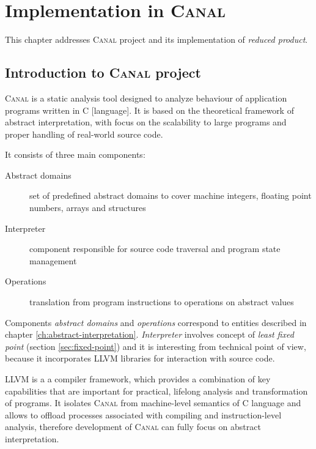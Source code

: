 \documentclass[12pt,oneside,draft]{fithesis2}
\begin{document}
\chapter{Implementation in \textsc{Canal}}

This chapter addresses \textsc{Canal} project and its implementation of \textit{reduced product}.

\section{Introduction to \textsc{Canal} project}

\textsc{Canal} is a static analysis tool designed to analyze behaviour of
application programs written in C [language]. It is based on the theoretical
framework of abstract interpretation, with focus on the scalability to
large programs and proper handling of real-world source code. \cite{Canal}

It consists of three main components:

\begin{description}
  \item[Abstract domains] set of predefined abstract domains to cover machine integers, floating point numbers, arrays and structures
  \item[Interpreter] component responsible for source code traversal and program state management
  \item[Operations] translation from program instructions to operations on abstract values
\end{description}

Components \textit{abstract domains} and \textit{operations} correspond to entities described in chapter \ref{ch:abstract-interpretation}. \textit{Interpreter} involves concept of \textit{least fixed point} (section \ref{sec:fixed-point}) and it is interesting from technical point of view, because it incorporates LLVM libraries for interaction with source code.

LLVM is a a compiler framework, which provides a combination of key capabilities that are important for practical, lifelong analysis and
transformation of programs. \cite{llvm} It isolates \textsc{Canal} from machine-level semantics of C language and allows to offload processes associated with compiling and instruction-level analysis, therefore development of \textsc{Canal} can fully focus on abstract interpretation.
\end{document}
